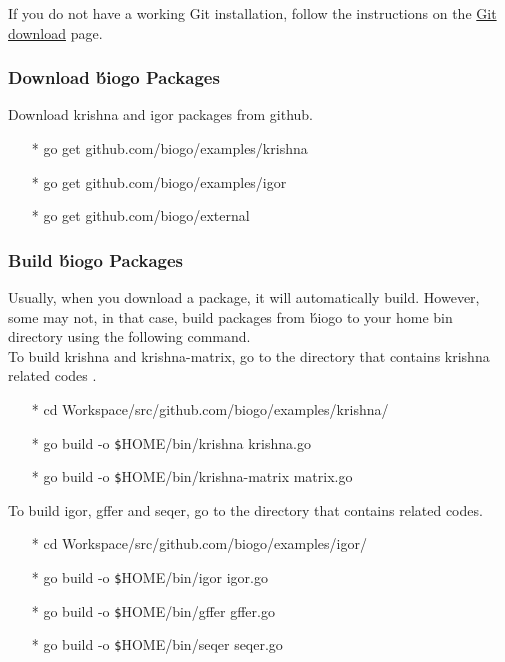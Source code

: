 \documentclass[12pt]{report}
\begin{document}
\noindent If you do not have a working Git installation, follow the instructions on the \href{https://git-scm.com/downloads}{\color{blue}Git download} page.

\subsubsection*{ Download \'biogo Packages}
Download krishna and igor packages from github.

\begin{enumerate}
	\item[*] go get github.com/biogo/examples/krishna
	\item[*] go get github.com/biogo/examples/igor
	\item[*] go get github.com/biogo/external
\end{enumerate}

\subsubsection*{ Build \'biogo Packages}
Usually, when you download a package, it will automatically build. However, some may not, in that case, build packages from \'biogo to your home bin directory using the following command. \\

To build krishna and krishna-matrix, go to the directory that contains krishna related codes {}.

\begin{enumerate} 
	\item[*] cd Workspace/src/github.com/biogo/examples/krishna/
	\item[*] go build -o \texttt{\$}HOME/bin/krishna krishna.go
	\item[*] go build -o \texttt{\$}HOME/bin/krishna-matrix matrix.go
\end{enumerate}

To build igor, gffer and seqer, go to the directory that contains related codes.
\begin{enumerate}
	\item[*] cd Workspace/src/github.com/biogo/examples/igor/
	\item[*] go build -o \texttt{\$}HOME/bin/igor igor.go
	\item[*] go build -o \texttt{\$}HOME/bin/gffer gffer.go
	\item[*] go build -o \texttt{\$}HOME/bin/seqer seqer.go
\end{enumerate}
\end{document}
